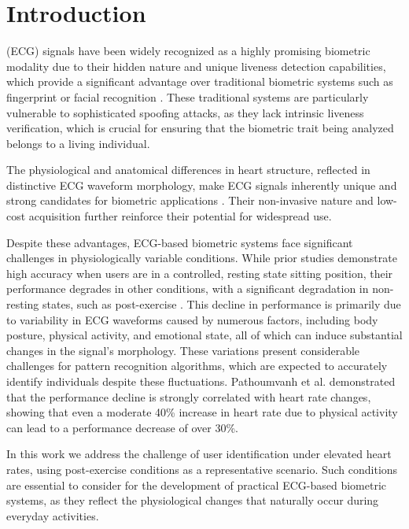 \section{Introduction}

 (ECG) signals have been widely recognized as a highly promising biometric modality due to their hidden nature and unique liveness detection capabilities, which provide a significant advantage over traditional biometric systems such as fingerprint or facial recognition \cite{Uwaechia2021}. These traditional systems are particularly vulnerable to sophisticated spoofing attacks, as they lack intrinsic liveness verification, which is crucial for ensuring that the biometric trait being analyzed belongs to a living individual.

The physiological and anatomical differences in heart structure, reflected in distinctive ECG waveform morphology, make ECG signals inherently unique and strong candidates for biometric applications \cite{interindividualECG, 8392675}. Their non-invasive nature and low-cost acquisition further reinforce their potential for widespread use.

Despite these advantages, ECG-based biometric systems face significant challenges in physiologically variable conditions.
While prior studies demonstrate high accuracy when users are in a controlled, resting state sitting position, their performance degrades in other conditions, with a significant degradation in non-resting states, such as post-exercise \cite{Wahabi2014, Hwang2021, Jyotishi2022}.
This decline in performance is primarily due to variability in ECG waveforms caused by numerous factors, including body posture, physical activity, and emotional state, all of which can induce substantial changes in the signal's morphology. These variations present considerable challenges for pattern recognition algorithms, which are expected to accurately identify individuals despite these fluctuations.
Pathoumvanh et al. \cite{Pathoumvanh} demonstrated that the performance decline is strongly correlated with heart rate changes, showing that even a moderate 40\% increase in heart rate due to physical activity can lead to a performance decrease of over 30\%.

In this work we address the challenge of user identification under elevated heart rates, 
using post-exercise conditions as a representative scenario. Such conditions are essential to consider for the development of practical ECG-based biometric systems, as they reflect the physiological changes that naturally occur during everyday activities.

